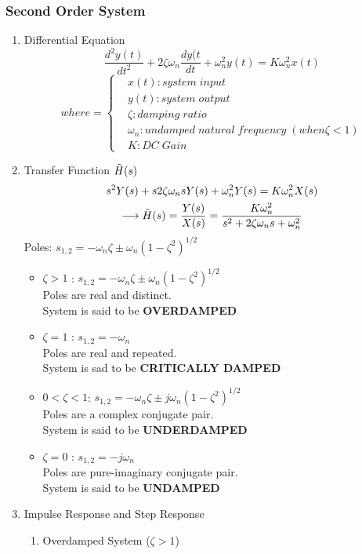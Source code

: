 \documentclass{article}
\begin{document}
\subsubsection{Second Order System}
\begin{enumerate}
    \item Differential Equation
    \begin{equation}
        \frac{d^2y(t)}{dt^2}+2\zeta\omega_n\frac{dy(t}{dt}+\omega_n^2y(t) = K\omega_n^2x(t)
    \end{equation}
    \[
    where = 
    \begin{cases}
        & x(t) : system\;input \\
        & y(t) : system\;output \\
        & \zeta : damping\;ratio\\
        & \omega_n : undamped\;natural\;frequency\;(when \zeta < 1) \\
        & K : DC\;Gain
    \end{cases}
    \]
    \item Transfer Function $\Tilde{H}(s)$
    \begin{multline}
        s^2Y(s)+s2\zeta\omega_nsY(s)+\omega_n^2Y(s) = K\omega_n^2X(s) \\
        \longrightarrow \Tilde{H}(s)=\frac{Y(s)}{X(s)} = \frac{K\omega_n^2}{s^2+2\zeta\omega_n s+\omega_n^2}
    \end{multline}
    Poles: $s_{1,2} = -\omega_n\zeta \pm \omega_n(1-\zeta^2)^{1/2}$ 
    \begin{itemize}
        \item $\zeta > 1 $ : $s_{1,2} = -\omega_n\zeta \pm \omega_n(1-\zeta^2)^{1/2}$ \\
        Poles are real and distinct. \\
        System is said to be \textbf{OVERDAMPED}
        \item $\zeta = 1$ : $s_{1,2} =-\omega_n$ \\
        Poles are real and repeated. \\
        System is sad to be \textbf{CRITICALLY DAMPED}
        \item $0<\zeta<1$: $s_{1,2} = -\omega_n\zeta \pm j\omega_n(1-\zeta^2)^{1/2}$ \\
        Poles are a complex conjugate pair. \\
        System is said to be \textbf{UNDERDAMPED}
        \item $\zeta = 0$ : $s_{1,2} =-j\omega_n$ \\
        Poles are pure-imaginary conjugate pair. \\
        System is said to be \textbf{UNDAMPED}
    \end{itemize}
    \item Impulse Response and Step Response
    \begin{enumerate}
        \item Overdamped System ($\zeta > 1$)
    \end{enumerate}


\newpage
\end{enumerate}
\end{document}
